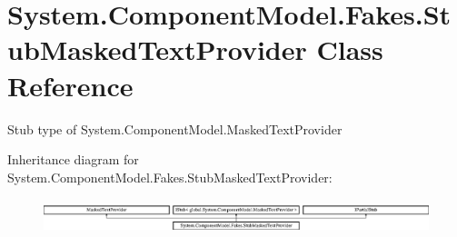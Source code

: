 \hypertarget{class_system_1_1_component_model_1_1_fakes_1_1_stub_masked_text_provider}{\section{System.\-Component\-Model.\-Fakes.\-Stub\-Masked\-Text\-Provider Class Reference}
\label{class_system_1_1_component_model_1_1_fakes_1_1_stub_masked_text_provider}
}


Stub type of System.\-Component\-Model.\-Masked\-Text\-Provider 


Inheritance diagram for System.\-Component\-Model.\-Fakes.\-Stub\-Masked\-Text\-Provider\-:\begin{figure}[H]
\begin{center}
\leavevmode
\includegraphics[height=1.003584cm]{class_system_1_1_component_model_1_1_fakes_1_1_stub_masked_text_provider}
\end{center}
\end{figure}
